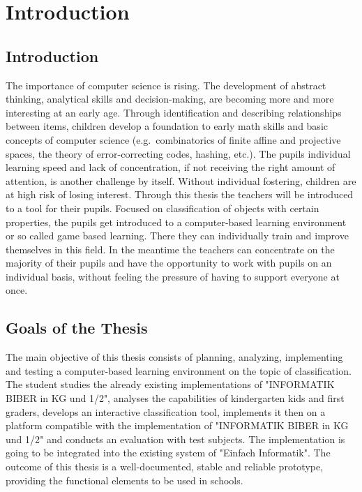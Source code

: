 
\setcounter{chapter}{0}

\chapter{Introduction}\label{ch:introduction}
\section{Introduction}\label{sec:introduction}
The importance of computer science is rising.
The development of abstract thinking, analytical skills and decision-making,
are becoming more and more interesting at an early age.
Through identification and describing relationships between items,
children develop a foundation to early math skills and basic concepts of computer science
(e.g.\ combinatorics of finite affine and projective spaces, the theory of error-correcting codes, hashing, etc.)\cite{cardgameset}.
The pupils individual learning speed and lack of concentration,
if not receiving the right amount of attention, is another challenge by itself.
Without individual fostering, children are at high risk of losing interest.
Through this thesis the teachers will be introduced to a tool for their pupils.
Focused on classification of objects with certain properties, the pupils get introduced to a computer-based
learning environment or so called game based learning.
There they can individually train and improve themselves in this field.
In the meantime the teachers can concentrate on the majority of their pupils and have the opportunity to work with
pupils on an individual basis, without feeling the pressure of having to support everyone at once.

\section{Goals of the Thesis}\label{sec:goals-of-the-thesis}
The main objective of this thesis consists of planning, analyzing, implementing
and testing a computer-based learning environment on the topic of
classification. The student studies the already existing implementations of
"INFORMATIK BIBER in KG und 1/2", analyses the capabilities of kindergarten kids
and first graders, develops an interactive classification tool, implements it
then on a platform compatible with the implementation of "INFORMATIK BIBER in KG
und 1/2"\cite{ibkg12} and conducts an evaluation with test subjects.
The implementation is going to be integrated into the existing system of "Einfach Informatik"\cite{einfachinformatik}.
The outcome of this thesis is a well-documented, stable and
reliable prototype, providing the functional elements to be used in schools.

